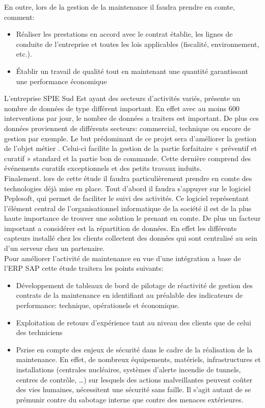 \documentclass[]{scrartcl}
\begin{document}
En outre, lors de la gestion de la maintenance il faudra prendre en comte, comment:
\begin{itemize}
\item Réaliser les prestations en accord avec le contrat établie, les lignes de conduite de l'entreprise et toutes les lois applicables (fiscalité, environnement, etc.). 
\item Établir un travail de qualité tout en maintenant une quantité garantissant une performance économique\\
\end{itemize}

L'entreprise SPIE Sud Est ayant des secteurs d'activités variés, présente un nombre de données de type différent important. En effet avec au moins 600 interventions par jour, le nombre de données a traiters est important.  De plus ces données proviennent de différents secteurs: commercial, technique ou encore de gestion par exemple. Le but prédominant de ce projet sera d'améliorer la gestion de l'objet métier . Celui-ci facilite la gestion de la partie forfaitaire  « préventif et curatif » standard et la partie  bon de commande. Cette dernière comprend des événements curatifs exceptionnels et des petits travaux induits.   \\

Finalement. lors de cette étude il faudra particulièrement prendre en comte des technologies déjà mise en place.  Tout d'abord il faudra s'appuyer sur le logiciel Peplesoft, qui permet de faciliter le suivi des activités. Ce logiciel représentant   l'élément central de l'organisationnel informatique de la société il est de la plus haute importance de trouver une solution le prenant en comte.  De plus un facteur important a considérer est la répartition de données. En effet les différents capteurs installé chez les clients collectent des données qui sont centralisé au sein d'un serveur chez un partenaire. \\ 

Pour améliorer l'activité de maintenance en vue d'une intégration a base de l'ERP SAP cette étude traitera les points suivants: 
\begin{itemize}
\item Développement de tableaux de bord de pilotage de réactivité de gestion des contrats de
la maintenance en identifiant au préalable des indicateurs de performance: technique, opérationels et économique.
\item Exploitation de retours d’expérience tant au niveau des clients que de celui des techniciens
\item Psrise en compte des enjeux de sécurité dans le cadre de la réalisation de la maintenance.
En effet, de nombreux équipements, matériels, infrastructures et installations (centrales
nucléaires, systèmes d’alerte incendie de tunnels, centres de contrôle, …) sur lesquels
des actions malveillantes peuvent coûter des vies humaines, nécessitent une sécurité sans
faille. Il s’agit autant de se prémunir contre du sabotage interne que contre des menaces
extérieures. 
\end{itemize}
\end{document}
